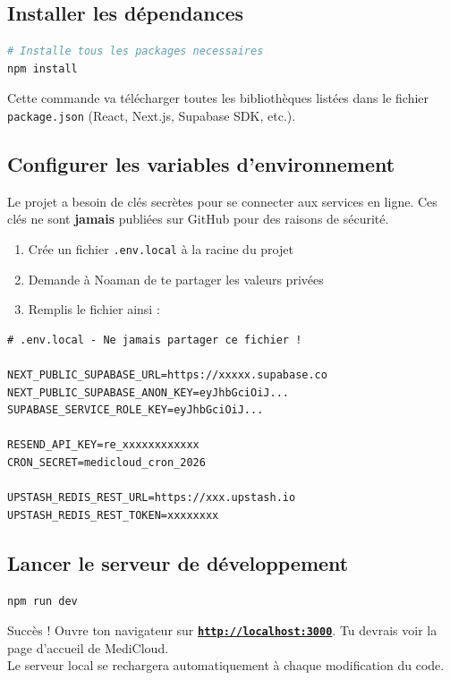 \documentclass[12pt, a4paper]{article}
\begin{document}
\subsection{Installer les dépendances}

\begin{lstlisting}[language=bash]
# Installe tous les packages necessaires
npm install
\end{lstlisting}

Cette commande va télécharger toutes les bibliothèques listées dans le
fichier \texttt{package.json} (React, Next.js, Supabase SDK, etc.).

\subsection{Configurer les variables d'environnement}

Le projet a besoin de clés secrètes pour se connecter aux services en ligne.
Ces clés ne sont \textbf{jamais} publiées sur GitHub pour des raisons de sécurité.

\begin{enumerate}[label=\arabic*.]
  \item Crée un fichier \texttt{.env.local} à la racine du projet
  \item Demande à Noaman de te partager les valeurs privées
  \item Remplis le fichier ainsi :
\end{enumerate}

\begin{lstlisting}
# .env.local - Ne jamais partager ce fichier !

NEXT_PUBLIC_SUPABASE_URL=https://xxxxx.supabase.co
NEXT_PUBLIC_SUPABASE_ANON_KEY=eyJhbGciOiJ...
SUPABASE_SERVICE_ROLE_KEY=eyJhbGciOiJ...

RESEND_API_KEY=re_xxxxxxxxxxxx
CRON_SECRET=medicloud_cron_2026

UPSTASH_REDIS_REST_URL=https://xxx.upstash.io
UPSTASH_REDIS_REST_TOKEN=xxxxxxxx
\end{lstlisting}

\subsection{Lancer le serveur de développement}

\begin{lstlisting}[language=bash]
npm run dev
\end{lstlisting}

\begin{successbox}{Succès !}
  Ouvre ton navigateur sur \textbf{\href{http://localhost:3000}{\texttt{http://localhost:3000}}}.
  Tu devrais voir la page d'accueil de MediCloud. \\
  Le serveur local se rechargera automatiquement à chaque modification du code.
\end{successbox}
\end{document}
